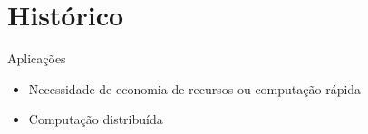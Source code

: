 \documentclass[dvipsnames]{beamer}
\newcommand{\R}{\mathbb{R}}
\begin{document}
\section{Histórico}



\begin{frame}{Aplicações}
  \begin{itemize}
    \item Necessidade de economia de recursos ou computação rápida
      \item <2->Computação distribuída
  \end{itemize}
\end{frame}
\end{document}
